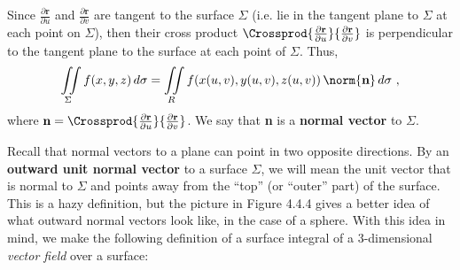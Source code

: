 Since $\frac{\partial \textbf{r}}{\partial u}$ and $\frac{\partial \textbf{r}}{\partial v}$ are tangent to the surface
$\Sigma$ (i.e. lie in the tangent plane to $\Sigma$ at each point on $\Sigma$), then their cross product
$\Crossprod{\frac{\partial \textbf{r}}{\partial u}}{\frac{\partial \textbf{r}}{\partial v}}$ is perpendicular to the
tangent plane to the surface at each point of $\Sigma$. Thus,
   \begin{displaymath}
 \iint\limits_{\Sigma} f(x,y,z)\,d\sigma = \iint\limits_{R} f(x(u,v),y(u,v),z(u,v))\,\norm{\textbf{n}}\,d\sigma ~,
\end{displaymath}
where $\textbf{n} = \Crossprod{\frac{\partial \textbf{r}}{\partial u}}{\frac{\partial \textbf{r}}{\partial v}}$.
We say that \textbf{n} is a \textbf{normal vector} to $\Sigma$.

\piccaption[]{}
Recall that normal vectors to a plane can point in two opposite directions. By an
\textbf{outward unit normal vector} to a surface $\Sigma$, we will mean the unit vector that is normal to $\Sigma$ and
points away from the ``top'' (or ``outer'' part) of the surface. This is a hazy definition, but the picture in
Figure 4.4.4 gives a better idea of what outward normal vectors look like, in the case of a sphere.
With this idea in mind, we make the following definition of a surface integral of a 3-dimensional
\emph{vector field} over a surface:

